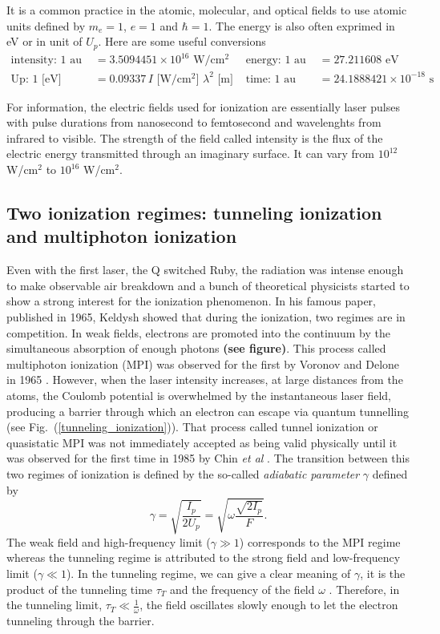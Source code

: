 \documentclass[a4paper]{article}
\begin{document}
It is a common practice in the atomic, molecular, and optical fields to use atomic units defined by $m_{e}=1$, $e=1$ and $\hbar=1$. The energy is also often exprimed in eV or in unit of $U_{p}$. Here are some useful conversions
\begin{align*}
\text{intensity: } 1 \text{ au } & = 3.5094451\times10^{16} \text{ W/cm$^{2}$ }  &\text{energy: } 1 \text{ au }&= 27.211608 \text{ eV} \\
\text{Up: } 1\text{ [eV]} &= 0.09337 \, I \text{ [W/cm$^{2}$] }\lambda^{2}\text{ [m] } &\text{time: } 1 \text{ au }&=24.1888421\times10^{-18} \text{ s} 
\end{align*}

For information, the electric fields used for ionization are essentially laser pulses with pulse durations from nanosecond to femtosecond and wavelenghts from infrared to visible.
The strength of the field called intensity is the flux of the electric energy transmitted through an imaginary surface. It can vary from $10^{12}$ W/cm$^{2}$ to $10^{16}$ W/cm$^{2}$.
 

\subsection{Two ionization regimes: tunneling ionization and multiphoton ionization}
Even with the first laser, the Q switched Ruby, the radiation was intense enough to make observable air breakdown and a bunch of theoretical physicists started to show a strong interest for the ionization phenomenon. In his famous paper, published in 1965, Keldysh showed that during the ionization, two regimes are in competition. In weak fields, electrons are promoted into the continuum by the simultaneous absorption of enough photons \textbf{(see figure)}. This process called multiphoton ionization (MPI) was observed for the first by Voronov and Delone in 1965 \cite{Voronov_1966}. However, when the laser intensity increases, at large distances from the atoms, the Coulomb potential is overwhelmed by the instantaneous laser field, producing a barrier through which an electron can escape via quantum tunnelling (see Fig.~(\ref{tunneling_ionization})). That process called tunnel ionization or quasistatic MPI was not immediately accepted as being valid physically until it was observed for the first time in 1985 by Chin \textit{et al} \cite{Chin_1985}. The transition between this two regimes of ionization is defined by the so-called \textit{adiabatic parameter} $\gamma$ defined by
\begin{equation}
\gamma=\sqrt{\frac{I_{p}}{2U_{p}}} = \sqrt{\omega\frac{\sqrt{2I_{p}}}{F}}.
\end{equation}
The weak field and high-frequency limit ($\gamma \gg 1$) corresponds to the MPI regime whereas the tunneling regime is attributed to the strong field and low-frequency limit ($\gamma \ll 1$). In the tunneling regime, we can give a clear meaning of $\gamma$, it is the product of the tunneling time $\tau_{T}$ and the frequency of the field $\omega$ \cite{Misha_2014}. Therefore, in the tunneling limit, $\tau_{T} \ll \frac{1}{\omega}$, the field oscillates slowly enough to let the electron tunneling through the barrier. 
\end{document}
